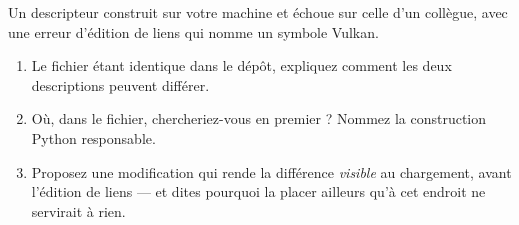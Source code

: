 \begin{nklogique}
Un descripteur construit sur votre machine et échoue sur celle d'un collègue,
avec une erreur d'édition de liens qui nomme un symbole Vulkan.

\begin{enumerate}
\item Le fichier étant identique dans le dépôt, expliquez comment les deux
      descriptions peuvent différer.
\item Où, dans le fichier, chercheriez-vous en premier ? Nommez la construction
      Python responsable.
\item Proposez une modification qui rende la différence \emph{visible} au
      chargement, avant l'édition de liens --- et dites pourquoi la placer
      ailleurs qu'à cet endroit ne servirait à rien.
\end{enumerate}
\end{nklogique}
